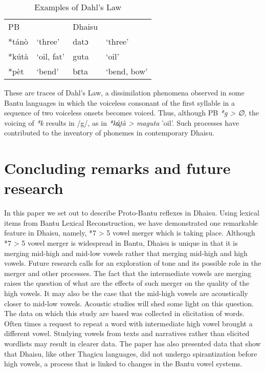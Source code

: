 \documentclass[output=paper,colorlinks,citecolor=brown]{langscibook}
\begin{document}
\begin{table}
    \caption{Examples of Dahl's Law}
    \label{tab:ngonyani:19}
    \begin{tabular}{@{}l l l l@{}}
        PB & & Dhaisu &  \\
        *tánò & `three' & datɔ & `three'\\
        *kútà & `oil, fat' & guta & `oil'\\
        *pèt & `bend'&  bɛta & `bend, bow'\\
    \end{tabular}
\end{table}

These are traces of Dahl’s Law, a dissimilation phenomena observed in some Bantu languages in which the voiceless consonant of the first syllable in a sequence of two voiceless onsets becomes voiced. Thus, although PB \textit{*g > ∅,} the voicing of \textit{*k} results in /g/, as in \textit{*kú̧tà > maguta} 'oil'. Such processes have contributed to the inventory of phonemes in contemporary Dhaisu.

\section{Concluding remarks and future research}\label{sec:ngonyani:6}

In this paper we set out to describe Proto-Bantu reflexes in Dhaisu. Using lexical items from Bantu Lexical Reconstruction, we have demonstrated one remarkable feature in Dhaisu, namely, *7 > 5 vowel merger which is taking place. Although *7 > 5 vowel merger is widespread in Bantu, Dhaisu is unique in that it is merging mid-high and mid-low vowels rather that merging mid-high and high vowels. Future research calls for an exploration of tone and its possible role in the merger and other processes. The fact that the intermediate vowels are merging raises the question of what are the effects of such merger on the quality of the high vowels. It may also be the case that the mid-high vowels are acoustically closer to mid-low vowels. Acoustic studies will shed some light on this question. The data on which this study are based was collected in elicitation of words. Often times a request to repeat a word with intermediate high vowel brought a different vowel. Studying vowels from texts and narratives rather than elicited wordlists may result in clearer data. The paper has also presented data that show that Dhaisu, like other Thagicu languages, did not undergo spirantization before high vowels, a process that is linked to changes in the Bantu vowel systems. 
\end{document}
